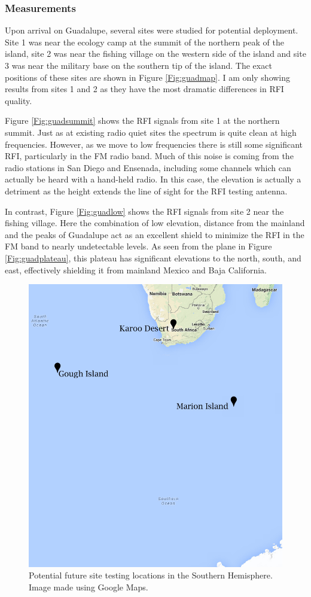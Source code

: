 \subsubsection{Measurements}

Upon arrival on Guadalupe, several sites were studied for potential deployment. Site 1 was near the ecology camp at the summit of the northern peak of the island, site 2 was near the fishing village on the western side of the island and site 3 was near the military base on the southern tip of the island. The exact positions of these sites are shown in Figure \ref{Fig:guadmap}. I am only showing results from sites 1 and 2 as they have the most dramatic differences in RFI quality. 

Figure \ref{Fig:guadsummit} shows the RFI signals from site 1 at the northern summit. Just as at existing radio quiet sites the spectrum is quite clean at high frequencies. However, as we move to low frequencies there is still some significant RFI, particularly in the FM radio band. Much of this noise is coming from the radio stations in San Diego and Ensenada, including some channels which can actually be heard with a hand-held radio. In this case, the elevation is actually a detriment as the height extends the line of sight for the RFI testing antenna. 

In contrast, Figure \ref{Fig:guadlow} shows the RFI signals from site 2 near the fishing village. Here the combination of low elevation, distance from the mainland and the peaks of Guadalupe act as an excellent shield to minimize the RFI in the FM band to nearly undetectable levels. As seen from the plane in Figure \ref{Fig:guadplateau}, this plateau has significant elevations to the north, south, and east, effectively shielding it from mainland Mexico and Baja California. 

\begin{figure}[htb]
\begin{center}
\includegraphics[width=0.7\linewidth]{RFI_testing/figures/site_testing_south_wdesert.jpg}
\caption{Potential future site testing locations in the Southern Hemisphere. Image made using Google Maps.}
\label{Fig:site_map_south}
\end{center}
\end{figure}



